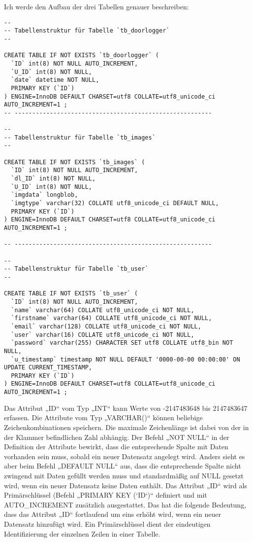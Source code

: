 Ich werde den Aufbau der drei Tabellen genauer beschreiben:
\begin{lstlisting}[caption={Aufbau der Datenbanktabellen},captionpos=b]
--
-- Tabellenstruktur für Tabelle `tb_doorlogger`
--

CREATE TABLE IF NOT EXISTS `tb_doorlogger` (
  `ID` int(8) NOT NULL AUTO_INCREMENT,
  `U_ID` int(8) NOT NULL,
  `date` datetime NOT NULL,
  PRIMARY KEY (`ID`)
) ENGINE=InnoDB DEFAULT CHARSET=utf8 COLLATE=utf8_unicode_ci AUTO_INCREMENT=1 ;
-- --------------------------------------------------------

--
-- Tabellenstruktur für Tabelle `tb_images`
--

CREATE TABLE IF NOT EXISTS `tb_images` (
  `ID` int(8) NOT NULL AUTO_INCREMENT,
  `dl_ID` int(8) NOT NULL,
  `U_ID` int(8) NOT NULL,
  `imgdata` longblob,
  `imgtype` varchar(32) COLLATE utf8_unicode_ci DEFAULT NULL,
  PRIMARY KEY (`ID`)
) ENGINE=InnoDB DEFAULT CHARSET=utf8 COLLATE=utf8_unicode_ci AUTO_INCREMENT=1 ;

-- --------------------------------------------------------

--
-- Tabellenstruktur für Tabelle `tb_user`
--

CREATE TABLE IF NOT EXISTS `tb_user` (
  `ID` int(8) NOT NULL AUTO_INCREMENT,
  `name` varchar(64) COLLATE utf8_unicode_ci NOT NULL,
  `firstname` varchar(64) COLLATE utf8_unicode_ci NOT NULL,
  `email` varchar(128) COLLATE utf8_unicode_ci NOT NULL,
  `user` varchar(16) COLLATE utf8_unicode_ci NOT NULL,
  `password` varchar(255) CHARACTER SET utf8 COLLATE utf8_bin NOT NULL,
  `u_timestamp` timestamp NOT NULL DEFAULT '0000-00-00 00:00:00' ON UPDATE CURRENT_TIMESTAMP,
  PRIMARY KEY (`ID`)
) ENGINE=InnoDB DEFAULT CHARSET=utf8 COLLATE=utf8_unicode_ci AUTO_INCREMENT=1 ;

\end{lstlisting}
Das Attribut „ID“ vom Typ „INT“ kann Werte von  -2147483648 bis 2147483647 erfassen. Die Attribute vom Typ „VARCHAR()“ können beliebige Zeichenkombinationen speichern. Die maximale Zeichenlänge ist dabei von der in der Klammer befindlichen Zahl abhängig. Der Befehl „NOT NULL“ in der Definition der Attribute bewirkt, dass die entsprechende Spalte mit Daten vorhanden sein muss, sobald ein neuer Datensatz angelegt wird. Anders sieht es aber beim Befehl „DEFAULT NULL“ aus, dass die entsprechende Spalte nicht zwingend mit Daten gefüllt werden muss und standardmäßig auf NULL gesetzt wird, wenn ein neuer Datensatz keine Daten enthält. Das Attribut „ID“ wird als Primärschlüssel (Befehl „PRIMARY KEY (`ID`)“ definiert und mit AUTO\_INCREMENT zusätzlich ausgestattet. Das hat die folgende Bedeutung, dass das Attribut „ID“ fortlaufend um eins erhöht wird, wenn ein neuer Datensatz hinzufügt wird. Ein Primärschlüssel dient der eindeutigen Identifizierung der einzelnen Zeilen in einer Tabelle. 

